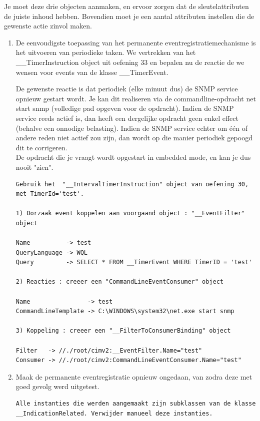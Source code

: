 \documentclass[11pt,a4paper]{report}
\begin{document}
Je moet deze drie objecten aanmaken, en ervoor zorgen dat de sleutelattributen de juiste inhoud hebben. Bovendien moet je een aantal attributen instellen die de gewenste actie zinvol maken.
\begin{enumerate}[resume]
	\item De eenvoudigste toepassing van het permanente eventregistratiemechanisme is het uitvoeren van periodieke taken. We vertrekken van het \_\_TimerInstruction object uit oefening 33 en bepalen nu de reactie de we wensen voor events van de klasse \_\_TimerEvent.
	\par De gewenste reactie is dat periodiek (elke minuut dus) de SNMP service opnieuw gestart wordt. Je kan dit realiseren via de commandline-opdracht net start snmp (volledige pad opgeven voor de opdracht). Indien de SNMP service reeds actief is, dan heeft een dergelijke opdracht geen enkel effect (behalve een onnodige belasting). Indien de SNMP service echter om één of andere reden niet actief zou zijn, dan wordt op die manier periodiek gepoogd dit te corrigeren.
	\\De opdracht die je vraagt wordt opgestart in embedded mode, en kan je dus nooit "zien".
	\begin{lstlisting}
Gebruik het  "__IntervalTimerInstruction" object van oefening 30, met TimerId='test'.

1) Oorzaak event koppelen aan voorgaand object : "__EventFilter" object

Name          -> test
QueryLanguage -> WQL
Query         -> SELECT * FROM __TimerEvent WHERE TimerID = 'test'

2) Reacties : creeer een "CommandLineEventConsumer" object

Name                -> test
CommandLineTemplate -> C:\WINDOWS\system32\net.exe start snmp

3) Koppeling : creeer een "__FilterToConsumerBinding" object

Filter   -> //./root/cimv2:__EventFilter.Name="test"
Consumer -> //./root/cimv2:CommandLineEventConsumer.Name="test"
	\end{lstlisting}
	\item Maak de permanente eventregistratie opnieuw ongedaan, van zodra deze met goed gevolg werd uitgetest.
	\begin{lstlisting}
Alle instanties die werden aangemaakt zijn subklassen van de klasse 
__IndicationRelated. Verwijder manueel deze instanties.
	\end{lstlisting}
\end{enumerate}
\end{document}
